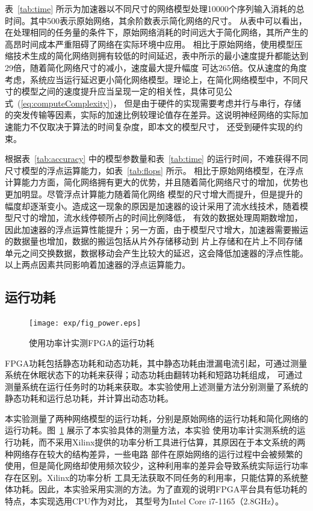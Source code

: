 表~\ref{tab:time} 所示为加速器以不同尺寸的网络模型处理10000个序列输入消耗的总时间。其中500表示原始网络，其余阶数表示简化网络的尺寸。
从表中可以看出，在处理相同的任务量的条件下，原始网络消耗的时间远大于简化网络，其所产生的高昂时间成本严重阻碍了网络在实际环境中应用。
相比于原始网络，使用模型压缩技术生成的简化网络则拥有较低的时间延迟，表中所示的最小速度提升都能达到29倍，随着简化网络尺寸的减小，速度最大提升幅度
可达265倍。仅从速度的角度考虑，系统应当运行延迟更小简化网络模型。理论上，在简化网络模型中，不同尺寸的模型之间的速度提升应当呈现一定的相关性，具体可见公式~(\ref{eq:computeComplexity})，
但是由于硬件的实现需要考虑并行与串行，存储的突发传输等因素，实际的加速比例较理论值存在差异。这说明神经网络的实际加速能力不仅取决于算法的时间复杂度，即本文的模型尺寸，
还受到硬件实现的约束。



根据表~\ref{tab:accuracy} 中的模型参数量和表~\ref{tab:time} 的运行时间，不难获得不同尺寸模型的浮点运算能力，如表~\ref{tab:flops} 所示。
相比于原始网络模型，在浮点计算能力方面，简化网络拥有更大的优势，并且随着简化网络尺寸的增加，优势也更加明显。尽管浮点计算能力随着简化网络
模型的尺寸增大而提升，但是提升的幅度却逐渐变小。造成这一现象的原因是加速器的设计采用了流水线技术，随着模型尺寸的增加，流水线停顿所占的时间比例降低，
有效的数据处理周期数增加，因此加速器的浮点运算性能提升；另一方面，由于模型尺寸增大，加速器需要搬运的数据量也增加，数据的搬运包括从片外存储移动到
片上存储和在片上不同存储单元之间交换数据，数据移动会产生比较大的延迟，这会降低加速器的浮点性能。以上两点因素共同影响着加速器的浮点运算能力。

\subsection{运行功耗}

\begin{figure}
	\centering
	\texttt{[image: exp/fig\_power.eps]}
	\caption{使用功率计实测FPGA的运行功耗}
	\label{fig:power}
\end{figure}



FPGA功耗包括静态功耗和动态功耗，其中静态功耗由泄漏电流引起，可通过测量系统在休眠状态下的功耗来获得；动态功耗由翻转功耗和短路功耗组成，
可通过测量系统在运行任务时的功耗来获取。本实验使用上述测量方法分别测量了系统的静态功耗和运行总功耗，并计算出动态功耗。

本实验测量了两种网络模型的运行功耗，分别是原始网络的运行功耗和简化网络的运行功耗。图~\ref{fig:power} 展示了本实验具体的测量方法，本实验
使用功率计实测系统的运行功耗，而不采用Xilinx提供的功率分析工具进行估算，其原因在于本文系统的两种网络存在较大的结构差异，一些电路
部件在原始网络的运行过程中会被频繁的使用，但是简化网络却使用频次较少，这种利用率的差异会导致系统实际运行功率存在区别。Xilinx的功率分析
工具无法获取不同任务的利用率，只能估算的系统整体功耗。因此，本实验采用实测的方法。为了直观的说明FPGA平台具有低功耗的特点，本实现选用CPU作为对比，
其型号为Intel Core i7-1165（2.8GHz）。

